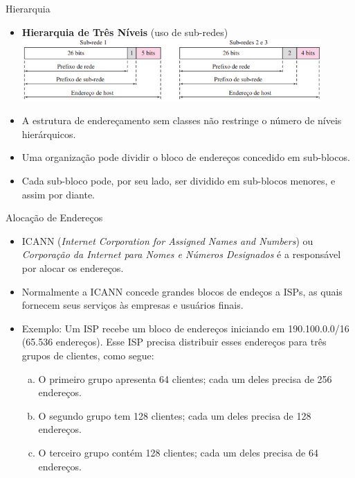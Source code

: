 \documentclass{libs/ufc_format}
\begin{document}
\begin{frame}{Hierarquia}
    \begin{itemize}
        \item \textbf{Hierarquia de Três Níveis} (uso de sub-redes)\\
        \centering
        \includegraphics[width=0.9\textwidth]{figuras/figura09_04}
        \justifying
        \item A estrutura de endereçamento sem classes não restringe o número de níveis hierárquicos.
        \item Uma organização pode dividir o bloco de endereços concedido em sub-blocos.
        \item Cada sub-bloco pode, por seu lado, ser dividido em sub-blocos menores, e assim por diante.
    \end{itemize}
\end{frame}

\begin{frame}{Alocação de Endereços}
    \begin{itemize}
        \justifying
        \item<1> ICANN (\textit{Internet Corporation for Assigned Names and Numbers}) ou \textit{Corporação da Internet para Nomes e Números Designados} é a responsável por alocar os endereços.
        \item<1> Normalmente a ICANN concede grandes blocos de endeços a ISPs, as quais fornecem seus serviços às empresas e usuários finais.
        \item<2-> Exemplo: Um ISP recebe um bloco de endereços iniciando em 190.100.0.0/16 (65.536 endereços). Esse ISP precisa distribuir esses endereços para três grupos de clientes, como segue:
            \begin{enumerate}[a)]
                \justifying
                \item<2-> O primeiro grupo apresenta 64 clientes; cada um deles precisa de 256 endereços.
                \item<2-> O segundo grupo tem 128 clientes; cada um deles precisa de 128 endereços.
                \item<2-> O terceiro grupo contém 128 clientes; cada um deles precisa de 64 endereços.
            \end{enumerate}
    \end{itemize}
\end{frame}
\end{document}
